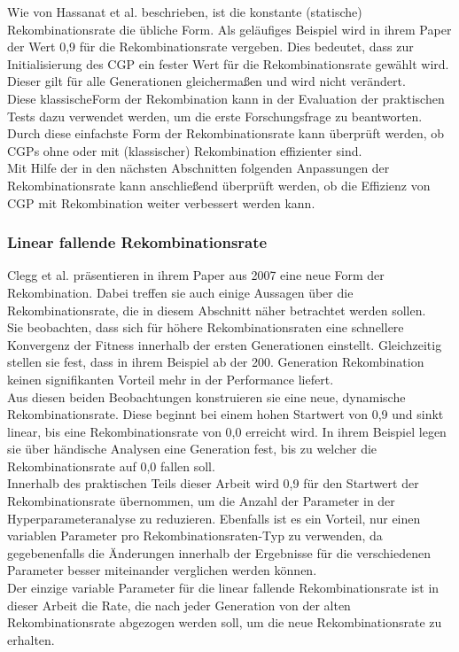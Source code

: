 Wie von Hassanat et al. beschrieben, ist die konstante (statische) Rekombinationsrate die übliche Form. 
Als geläufiges Beispiel wird in ihrem Paper der Wert 0,9 für die Rekombinationsrate vergeben. \cite{hassanat_choosing_2019} 
Dies bedeutet, dass zur Initialisierung des CGP ein fester Wert für die Rekombinationsrate gewählt wird.
Dieser gilt für alle Generationen gleichermaßen und wird nicht verändert.\\
Diese \glqq klassische\grqq\space Form der Rekombination kann in der Evaluation der praktischen Tests dazu verwendet werden, um die erste Forschungsfrage zu beantworten.
Durch diese einfachste Form der Rekombinationsrate kann überprüft werden, ob CGPs ohne oder mit (klassischer) Rekombination effizienter sind.\\
Mit Hilfe der in den nächsten Abschnitten folgenden Anpassungen der Rekombinationsrate kann anschließend überprüft werden, ob die Effizienz von CGP mit Rekombination weiter verbessert werden kann.

\subsubsection{Linear fallende Rekombinationsrate}
\label{subsubsec:CleggCrossover}

Clegg et al. präsentieren in ihrem Paper aus 2007 eine neue Form der Rekombination.
Dabei treffen sie auch einige Aussagen über die Rekombinationsrate, die in diesem Abschnitt näher betrachtet werden sollen.\cite{clegg_new_2007}\\
Sie beobachten, dass sich für höhere Rekombinationsraten eine schnellere Konvergenz der Fitness innerhalb der ersten Generationen einstellt.
Gleichzeitig stellen sie fest, dass in ihrem Beispiel ab der 200. Generation Rekombination keinen signifikanten Vorteil mehr in der Performance liefert.\\
Aus diesen beiden Beobachtungen konstruieren sie eine neue, dynamische Rekombinationsrate.
Diese beginnt bei einem hohen Startwert von 0,9 und sinkt linear, bis eine Rekombinationsrate von 0,0 erreicht wird. 
In ihrem Beispiel legen sie über händische Analysen eine Generation fest, bis zu welcher die Rekombinationsrate auf 0,0 fallen soll.\\
Innerhalb des praktischen Teils dieser Arbeit wird 0,9 für den Startwert der Rekombinationsrate übernommen, um die Anzahl der Parameter in der Hyperparameteranalyse zu reduzieren.
Ebenfalls ist es ein Vorteil, nur einen variablen Parameter pro Rekombinationsraten-Typ zu verwenden, da gegebenenfalls die Änderungen innerhalb der Ergebnisse für die verschiedenen Parameter besser miteinander verglichen werden können.\\
Der einzige variable Parameter für die linear fallende Rekombinationsrate ist in dieser Arbeit die Rate, die nach jeder Generation von der alten Rekombinationsrate abgezogen werden soll, um die neue Rekombinationsrate zu erhalten.

